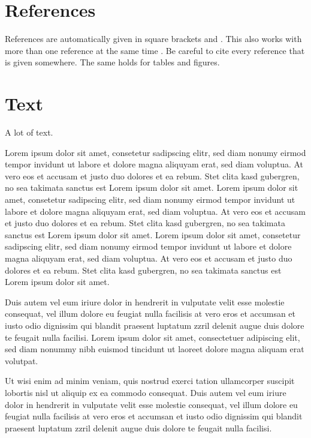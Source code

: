 \section{References}

References are automatically given in square brackets \cite{cohen2000} and \cite{wriggers2001}. This also works with more than one reference at the same time \cite{dorfmann2005, vu2006, marsden2001}. Be careful to cite every reference that is given somewhere. The same holds for tables and figures.

\section{Text}

A lot of text.

Lorem ipsum dolor sit amet, consetetur sadipscing elitr, sed diam nonumy eirmod tempor invidunt ut labore et dolore magna aliquyam erat, sed diam voluptua. At vero eos et accusam et justo duo dolores et ea rebum. Stet clita kasd gubergren, no sea takimata sanctus est Lorem ipsum dolor sit amet. Lorem ipsum dolor sit amet, consetetur sadipscing elitr, sed diam nonumy eirmod tempor invidunt ut labore et dolore magna aliquyam erat, sed diam voluptua. At vero eos et accusam et justo duo dolores et ea rebum. Stet clita kasd gubergren, no sea takimata sanctus est Lorem ipsum dolor sit amet. Lorem ipsum dolor sit amet, consetetur sadipscing elitr, sed diam nonumy eirmod tempor invidunt ut labore et dolore magna aliquyam erat, sed diam voluptua. At vero eos et accusam et justo duo dolores et ea rebum. Stet clita kasd gubergren, no sea takimata sanctus est Lorem ipsum dolor sit amet. 

Duis autem vel eum iriure dolor in hendrerit in vulputate velit esse molestie consequat, vel illum dolore eu feugiat nulla facilisis at vero eros et accumsan et iusto odio dignissim qui blandit praesent luptatum zzril delenit augue duis dolore te feugait nulla facilisi. Lorem ipsum dolor sit amet, consectetuer adipiscing elit, sed diam nonummy nibh euismod tincidunt ut laoreet dolore magna aliquam erat volutpat. 

Ut wisi enim ad minim veniam, quis nostrud exerci tation ullamcorper suscipit lobortis nisl ut aliquip ex ea commodo consequat. Duis autem vel eum iriure dolor in hendrerit in vulputate velit esse molestie consequat, vel illum dolore eu feugiat nulla facilisis at vero eros et accumsan et iusto odio dignissim qui blandit praesent luptatum zzril delenit augue duis dolore te feugait nulla facilisi. 

